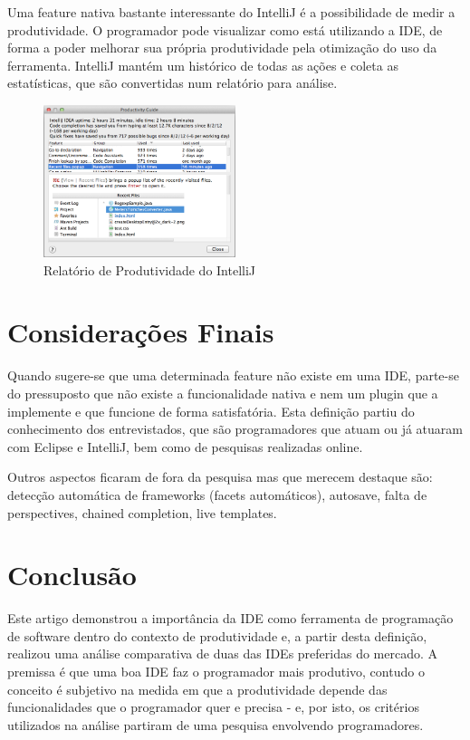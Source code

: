 \documentclass[12pt,journal,compsoc]{IEEEtran}
\begin{document}
Uma feature nativa bastante interessante do IntelliJ é a possibilidade de medir a produtividade. O programador pode visualizar como está utilizando a IDE, de forma a poder melhorar sua própria produtividade pela otimização do uso da ferramenta. IntelliJ mantém um histórico de todas as ações e coleta as estatísticas, que são convertidas num relatório para análise. \cite{intellij_as_eclipse_user}

\begin{figure}[ht!]
\centering
\includegraphics[width=0.5\textwidth]{img/54-productivity-guide}
\caption{Relatório de Produtividade do IntelliJ \cite{intellij_as_eclipse_user}}
\label{flow_before}
\end{figure}

\section{Considerações Finais}
Quando sugere-se que uma determinada feature não existe em uma IDE, parte-se do pressuposto que não existe a funcionalidade nativa e nem um plugin que a implemente e que funcione de forma satisfatória. Esta definição partiu do conhecimento dos entrevistados, que são programadores que atuam ou já atuaram com Eclipse e IntelliJ, bem como de pesquisas realizadas online. 

Outros aspectos ficaram de fora da pesquisa mas que merecem destaque são: detecção automática de frameworks (facets automáticos), autosave, falta de perspectives, chained completion, live templates.\cite{intellij_as_eclipse_user}

\section{Conclusão}
Este artigo demonstrou a importância da IDE como ferramenta de programação de software dentro do contexto de produtividade e, a partir desta definição, realizou uma análise comparativa de duas das IDEs preferidas do mercado. A premissa é que uma boa IDE faz o programador mais produtivo, contudo o conceito é subjetivo na medida em que a produtividade depende das funcionalidades que o programador quer e precisa\cite{intellij_as_eclipse_user} - e, por isto, os critérios utilizados na análise partiram de uma pesquisa envolvendo programadores. 
\end{document}

